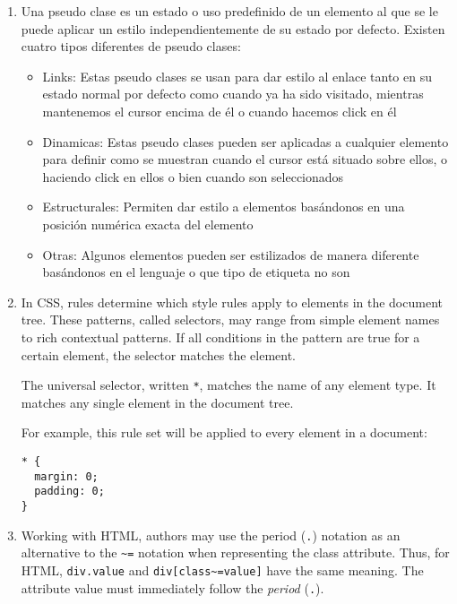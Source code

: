 \begin{enumerate}
\item 
{}

Una pseudo clase es un estado o uso predefinido de un elemento al
que se le puede aplicar un estilo independientemente de su estado por
defecto. Existen cuatro tipos diferentes de pseudo clases:
\begin{itemize}
\item
Links: Estas pseudo clases se usan para dar estilo al enlace tanto en
su estado normal por defecto como cuando ya ha sido visitado, mientras
mantenemos el cursor encima de él o cuando hacemos click en él
\item
Dinamicas: Estas pseudo clases pueden ser aplicadas a cualquier elemento
para definir como se muestran cuando el cursor está situado sobre ellos,
o haciendo click en ellos o bien cuando son seleccionados
\item
Estructurales: Permiten dar estilo a elementos basándonos en una
posición numérica exacta del elemento
\item
Otras: Algunos elementos pueden ser estilizados de manera diferente
basándonos en el lenguaje o que tipo de etiqueta no son
\end{itemize}

\item 
{}

In CSS,  rules determine which style rules apply
to elements in the document tree. 
These patterns, called selectors,
may range from simple element names to rich contextual patterns. If all
conditions in the pattern are true for a certain element, the selector
matches the element.

The universal selector, written \verb"*", matches the name of any element
type. It matches any single element in the document tree.

For example,
this rule set will be applied to every element in a document:
\begin{verbatim}
* {
  margin: 0;
  padding: 0;
}
\end{verbatim}
\item 
{}

Working with HTML, authors may use the period (\verb|.|) notation
as an alternative to the \verb|~=| notation when representing the class
attribute. Thus, for HTML, \verb|div.value| and \verb|div[class~=value]| have the same
meaning. The attribute value must immediately follow the {\it period} (\verb|.|).


\end{enumerate}
